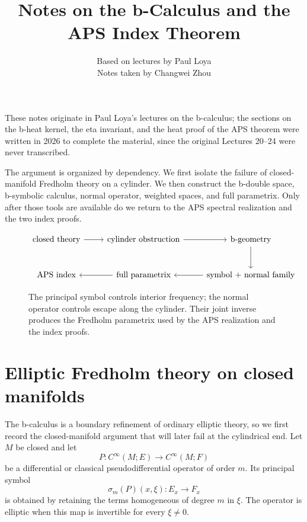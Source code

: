 \documentclass[12pt,oneside,reqno]{article}
\title{Notes on the b-Calculus and the APS Index Theorem}
\author{Based on lectures by Paul Loya\\[2pt] \small Notes taken by Changwei Zhou}
\date{}
\theoremstyle{plain}
\theoremstyle{definition}
\theoremstyle{remark}
\begin{document}
\hypersetup{pageanchor=false}
\maketitle
\thispagestyle{empty}
\clearpage
\hypersetup{pageanchor=true}
\begingroup
\small
\tableofcontents
\endgroup
\clearpage
\listoffigures
\clearpage
{}
\setcounter{page}{1}

These notes originate in Paul Loya's lectures on the b-calculus; the
sections on the b-heat kernel, the eta invariant, and the heat proof of
the APS theorem were written in 2026 to complete the material, since the
original Lectures 20--24 were never transcribed.

The argument is organized by dependency.  We first isolate the failure of
closed-manifold Fredholm theory on a cylinder.  We then construct the
b-double space, b-symbolic calculus, normal operator, weighted spaces, and
full parametrix.  Only after those tools are available do we return to the
APS spectral realization and the two index proofs.

\begin{figure}[htbp]
\centering
\[
\begin{tikzcd}[column sep=normal,row sep=large]
 \text{closed theory}
 \arrow[r]
 &\text{cylinder obstruction}
 \arrow[r]
 &\text{b-geometry}\arrow[d]\\
 \text{APS index}
 &\text{full parametrix}\arrow[l]
 &\text{symbol + normal family}\arrow[l]
\end{tikzcd}
\]
\caption[Logical order of the APS argument]{The principal symbol controls interior frequency; the normal
operator controls escape along the cylinder.  Their joint inverse produces
the Fredholm parametrix used by the APS realization and the index proofs.}
\end{figure}

\section{Elliptic Fredholm theory on closed manifolds}

The b-calculus is a boundary refinement of ordinary elliptic theory, so we
first record the closed-manifold argument that will later fail at the
cylindrical end. Let \(M\) be closed and let
\[
 P:C^\infty(M;E)\longrightarrow C^\infty(M;F)
\]
be a differential or classical pseudodifferential operator of order \(m\).
Its principal symbol
\[
 \sigma_m(P)(x,\xi):E_x\longrightarrow F_x
\]
is obtained by retaining the terms homogeneous of degree \(m\) in
\(\xi\). The operator is elliptic when this map is invertible for every
\(\xi\ne0\).
\end{document}
